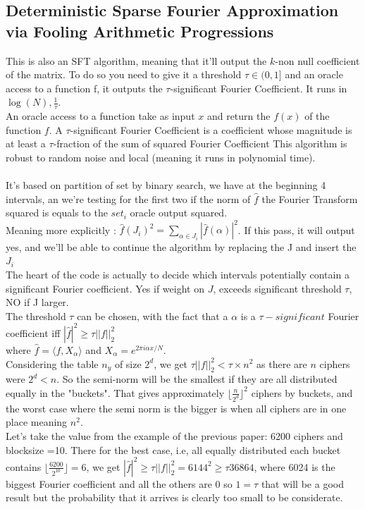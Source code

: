 \documentclass{article}
\begin{document}
\subsection{Deterministic Sparse Fourier Approximation via Fooling Arithmetic Progressions}
This is also an SFT algorithm, meaning that it'll output the $k$-non null coefficient of the matrix. To do so you need to give it a threshold $\tau \in (0,1]$ and an oracle access to a function f, it outputs the $\tau$-significant Fourier Coefficient. It runs in $\log(N),\frac{1}{\tau}$.\\
An oracle access to a function take as input $x$ and return the $f(x)$ of the function $f$. A $\tau$-significant Fourier Coefficient is a coefficient whose magnitude is at least a $\tau$-fraction of the sum of squared Fourier Coefficient
This algorithm is robust to random noise and local (meaning it runs in polynomial time).\\
\\
It's based on partition of set by binary search, we have at the beginning 4 intervals, an we're testing for the first two if the norm of $\hat{f}$ the Fourier Transform squared is equals to the $set_i$ oracle output squared.\\
Meaning more explicitly : $\hat{f}(J_i)^2 = \sum_{\alpha \in J_i}{|\hat{f}(\alpha)|^2}$. If this pass, it will output yes, and we'll be able to continue the algorithm by replacing the J and insert the $J_i$\\
The heart of the code is actually to decide which intervals potentially contain a significant Fourier coefficient. Yes if weight on $J$, exceeds significant threshold $\tau$, NO if J larger.\\
The threshold $\tau$ can be chosen, with the fact that a $\alpha$ is a $\tau -significant$ Fourier coefficient iff $|\hat{f}|^2 \geq \tau||f||^{2}_2$\\ where $\hat{f} = \langle f,X_{\alpha} \rangle$ and $X_{\alpha} = e^{2\pi i \alpha x/N}$.\\
Considering the table $n_y$ of size $2^d$, we get $\tau||f||^{2}_2 < \tau \times n^2$ as there are $n$ ciphers were $2^d <n$. So the semi-norm will be the smallest if they are all distributed equally in the "buckets". That gives approximately ${\lfloor \frac{n}{2^d} \rfloor}^{2}$ ciphers by buckets, and the worst case where the semi norm is the bigger is when all ciphers are in one place meaning $n^2$.\\
Let's take the value from the example of the previous paper: 6200 ciphers and blocksize =10. There for the best case, i.e, all equally distributed each bucket contains ${\lfloor \frac{6200}{2^{10}} \rfloor} = 6$, we get $|\hat{f}|^2 \geq \tau||f||^{2}_2 =  6144^2 \geq \tau 36864$, where 6024 is the biggest Fourier coefficient and all the others are 0 so $ 1 = \tau$ that will be a good result but the probability that it arrives is clearly too small to be considerate.\\
\end{document}
